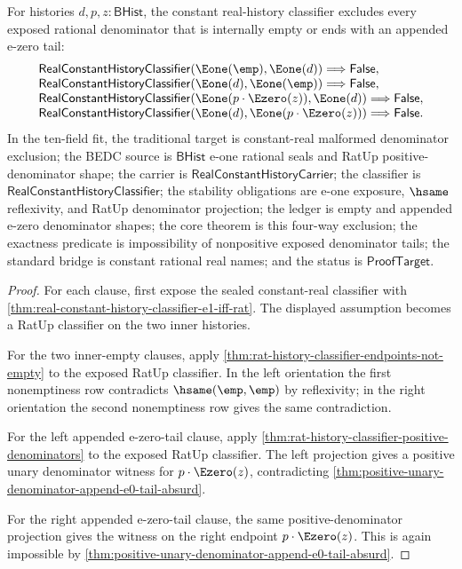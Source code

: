 \begin{theorem}
\label{thm:real-constant-history-classifier-malformed-inner-denominator-absurd}
For histories $d,p,z:\mathsf{BHist}$, the constant real-history classifier
excludes every exposed rational denominator that is internally empty or ends
with an appended e-zero tail:
$$
\begin{array}{l}
\mathsf{RealConstantHistoryClassifier}(\Eone(\emp),\Eone(d))
\Longrightarrow\mathsf{False},\\
\mathsf{RealConstantHistoryClassifier}(\Eone(d),\Eone(\emp))
\Longrightarrow\mathsf{False},\\
\mathsf{RealConstantHistoryClassifier}(\Eone(p\cdot\Ezero(z)),\Eone(d))
\Longrightarrow\mathsf{False},\\
\mathsf{RealConstantHistoryClassifier}(\Eone(d),\Eone(p\cdot\Ezero(z)))
\Longrightarrow\mathsf{False}.
\end{array}
$$
In the ten-field fit, the traditional target is constant-real malformed
denominator exclusion; the BEDC source is $\mathsf{BHist}$ e-one rational seals
and RatUp positive-denominator shape; the carrier is
$\mathsf{RealConstantHistoryCarrier}$; the classifier is
$\mathsf{RealConstantHistoryClassifier}$; the stability obligations are e-one
exposure, $\hsame$ reflexivity, and RatUp denominator projection; the ledger is
empty and appended e-zero denominator shapes; the core theorem is this four-way
exclusion; the exactness predicate is impossibility of nonpositive exposed
denominator tails; the standard bridge is constant rational real names; and the
status is $\mathsf{ProofTarget}$.
\end{theorem}
\begin{proof}
For each clause, first expose the sealed constant-real classifier with
\autoref{thm:real-constant-history-classifier-e1-iff-rat}. The displayed
assumption becomes a RatUp classifier on the two inner histories.

For the two inner-empty clauses, apply
\autoref{thm:rat-history-classifier-endpoints-not-empty} to the exposed RatUp
classifier. In the left orientation the first nonemptiness row contradicts
$\hsame(\emp,\emp)$ by reflexivity; in the right orientation the second
nonemptiness row gives the same contradiction.

For the left appended e-zero-tail clause, apply
\autoref{thm:rat-history-classifier-positive-denominators} to the exposed RatUp
classifier. The left projection gives a positive unary denominator witness for
$p\cdot\Ezero(z)$, contradicting
\autoref{thm:positive-unary-denominator-append-e0-tail-absurd}.

For the right appended e-zero-tail clause, the same positive-denominator
projection gives the witness on the right endpoint $p\cdot\Ezero(z)$. This is
again impossible by
\autoref{thm:positive-unary-denominator-append-e0-tail-absurd}.
\end{proof}

